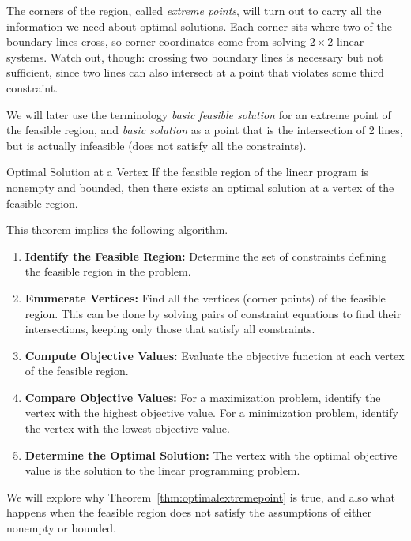 The corners of the region, called \emph{extreme points}, will turn out to carry all the information we need about optimal solutions.  Each corner sits where two of the boundary lines cross, so corner coordinates come from solving $2 \times 2$ linear systems.  Watch out, though: crossing two boundary lines is necessary but not sufficient, since two lines can also intersect at a point that violates some third constraint.

We will later use the terminology \emph{basic feasible solution} for an extreme point of the feasible region, and \emph{basic solution} as a point that is the intersection of 2 lines, but is actually infeasible (does not satisfy all the constraints).

\begin{theorem}{Optimal Solution at a Vertex}\label{thm:optimalextremepoint}
If the feasible region of the linear program is nonempty and bounded, then there exists an optimal solution at a vertex of the feasible region.
\end{theorem}

This theorem implies the following algorithm.
\begin{algorithm}[H]
\caption{Enumerate Vertices Algorithm for Solving a Linear Programming Problem}
\label{alg:EnumerateVertices}
\begin{enumerate}
    \item \textbf{Identify the Feasible Region:}
    Determine the set of constraints defining the feasible region in the problem.
    \item \textbf{Enumerate Vertices:}
    Find all the vertices (corner points) of the feasible region. This can be done by solving pairs of constraint equations to find their intersections, keeping only those that satisfy all constraints.
    \item \textbf{Compute Objective Values:}
    Evaluate the objective function at each vertex of the feasible region.
    \item \textbf{Compare Objective Values:}
    For a maximization problem, identify the vertex with the highest objective value. For a minimization problem, identify the vertex with the lowest objective value.
    \item \textbf{Determine the Optimal Solution:}
    The vertex with the optimal objective value is the solution to the linear programming problem.
\end{enumerate}
\end{algorithm}

We will explore why Theorem~\ref{thm:optimalextremepoint} is true, and also what happens when the feasible region does not satisfy the assumptions of either nonempty or bounded.

